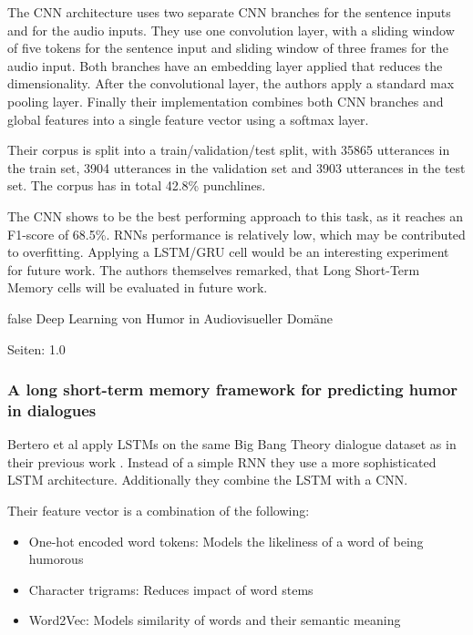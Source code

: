 \documentclass[draft,final,oneside]{vutinfth} %
\begin{document}
The CNN architecture uses two separate CNN branches for the sentence inputs and for the audio inputs. They use one convolution layer, with a sliding window of five tokens for the sentence input and sliding window of three frames for the audio input. Both branches have an embedding layer applied that reduces the dimensionality. After the convolutional layer, the authors apply a standard max pooling layer. Finally their implementation combines both CNN branches and global features into a single feature vector using a softmax layer.

Their corpus is split into a train/validation/test split, with 35865 utterances in the train set, 3904 utterances in the validation set and 3903 utterances in the test set. The corpus has in total 42.8\% punchlines.

The CNN shows to be the best performing approach to this task, as it reaches an F1-score of 68.5\%. RNNs performance is relatively low, which may be contributed to overfitting. Applying a LSTM/GRU cell would be an interesting experiment for future work. The authors themselves remarked, that Long Short-Term Memory cells will be evaluated in future work.

\if false
Deep Learning von Humor in Audiovisueller Domäne

Seiten: 1.0

\cite{Bertero2016DeepLO}
\fi

\subsubsection{A long short-term memory framework for predicting humor in dialogues}

Bertero et al apply LSTMs on the same Big Bang Theory dialogue dataset as in their previous work \cite{Bertero2016DeepLO}. Instead of a simple RNN they use a more sophisticated LSTM architecture. Additionally they combine the LSTM with a CNN.

Their feature vector is a combination of the following:
\begin{itemize}

\item One-hot encoded word tokens: Models the likeliness of a word of being humorous
\item Character trigrams: Reduces impact of word stems
\item Word2Vec: Models similarity of words and their semantic meaning

\end{itemize}
\end{document}
